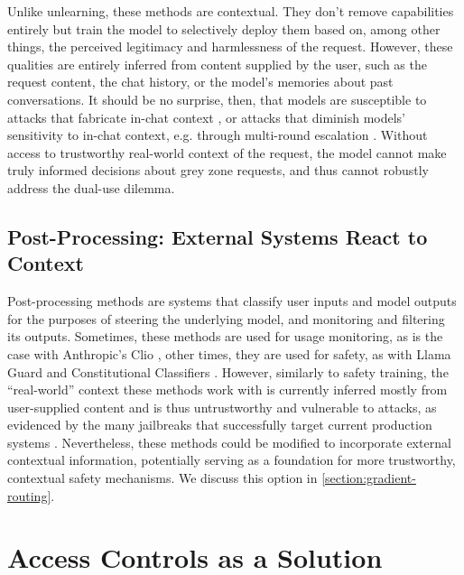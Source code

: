 \documentclass{article}
\theoremstyle{plain}
\theoremstyle{definition}
\theoremstyle{remark}
\begin{document}
Unlike unlearning, these methods are contextual.
They don't remove capabilities entirely but train the model to selectively deploy them based on, among other things, the perceived legitimacy and harmlessness of the request.
However, these qualities are entirely inferred from content supplied by the user, such as the request content, the chat history, or the model's memories about past conversations.
It should be no surprise, then, that models are susceptible to attacks that fabricate in-chat context \cite{zeng2024johnnypersuadellmsjailbreak}, or attacks that diminish models' sensitivity to in-chat context, e.g. through multi-round escalation \cite{russinovich2025greatwritearticlethat}.
Without access to trustworthy real-world context of the request, the model cannot make truly informed decisions about grey zone requests, and thus cannot robustly address the dual-use dilemma.

\subsection{Post-Processing: External Systems React to Context}

Post-processing methods are systems that classify user inputs and model outputs for the purposes of steering the underlying model, and monitoring and filtering its outputs.
Sometimes, these methods are used for usage monitoring, as is the case with Anthropic's Clio \cite{tamkin2024clioprivacypreservinginsightsrealworld, handa2025economictasksperformedai}, other times, they are used for safety, as with Llama Guard \cite{inan2023llamaguardllmbasedinputoutput} and Constitutional Classifiers \cite{sharma2025constitutionalclassifiersdefendinguniversal}.
However, similarly to safety training, the ``real-world'' context these methods work with is currently inferred mostly from user-supplied content and is thus untrustworthy and vulnerable to attacks, as evidenced by the many jailbreaks that successfully target current production systems \cite{zhang2025outputconstraintsattacksurface}.
Nevertheless, these methods could be modified to incorporate external contextual information, potentially serving as a foundation for more trustworthy, contextual safety mechanisms. We discuss this option in \cref{section:gradient-routing}.

\section{Access Controls as a Solution}
\label{section:access-controls}
\end{document}
